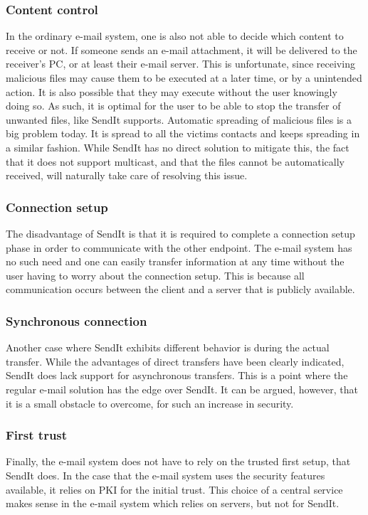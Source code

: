   \subsubsection*{Content control}
  In the ordinary e-mail system, one is also not able to decide which content to receive or not. If someone sends an e-mail attachment, it will be delivered to the receiver's PC, or at least their e-mail server. This is unfortunate, since receiving malicious files may cause them to be executed at a later time, or by a unintended action. It is also possible that they may execute without the user knowingly doing so. As such, it is optimal for the user to be able to stop the transfer of unwanted files, like SendIt supports.
  Automatic spreading of malicious files is a big problem today. It is spread to all the victims contacts and keeps spreading in a similar fashion. While SendIt has no direct solution to mitigate this, the fact that it does not support multicast, and that the files cannot be automatically received, will naturally take care of resolving this issue.
%
%
  \subsubsection*{Connection setup}
  The disadvantage of SendIt is that it is required to complete a connection setup phase in order to communicate with the other endpoint. The e-mail system has no such need and one can easily transfer information at any time without the user having to worry about the connection setup. This is because all communication occurs between the client and a server that is publicly available.
%
  \subsubsection*{Synchronous connection}
  Another case where SendIt exhibits different behavior is during the actual transfer. While the advantages of direct transfers have been clearly indicated, SendIt does lack support for asynchronous transfers. This is a point where the regular e-mail solution has the edge over SendIt. It can be argued, however, that it is a small obstacle to overcome, for such an increase in security.
%
  \subsubsection*{First trust}
  Finally, the e-mail system does not have to rely on the trusted first setup, that SendIt does. In the case that the e-mail system uses the security features available, it relies on PKI for the initial trust. This choice of a central service makes sense in the e-mail system which relies on servers, but not for SendIt.
%
